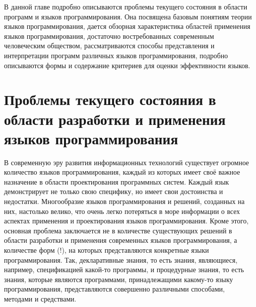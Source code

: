 В данной главе подробно описываются проблемы текущего состояния в области программ и языков программирования. Она посвящена базовым понятиям теории языков программирования, дается обзорная характеристика областей применения языков программирования, достаточно востребованных современным человеческим обществом, рассматриваются способы представления и интерпретации программ различных языков программирования, подробно описываются формы и содержание критериев для оценки эффективности языков.

\section{Проблемы текущего состояния в области разработки и применения языков программирования}

В современную эру развития информационных технологий существует огромное количество языков программирования, каждый из которых имеет своё важное назначение в области проектирования программных систем. Каждый язык демонстрирует не только свою специфику, но имеет свои достоинства и недостатки. Многообразие языков программирования \cite{Sebesta2012} и решений, созданных на них, настолько велико, что очень легко потеряться в море информации о всех аспектах применения и проектирования языков программирования. Кроме этого, основная проблема заключается не в количестве существующих решений в области разработки и применения современных языков программирования, а количестве форм (!), на которых представляются конкретные языки программирования. Так, декларативные знания, то есть знания, являющиеся, например, спецификацией какой-то программы, и процедурные знания, то есть знания, которые являются программами, принадлежащими какому-то языку программирования, представляются совершенно различными способами, методами и средствами.

